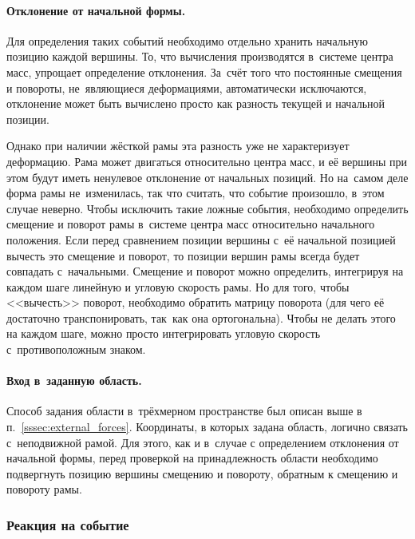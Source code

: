\documentclass[a4paper, 14pt, titlepage]{extarticle}
\begin{document}
        \paragraph{Отклонение от начальной формы.}
        Для определения таких событий необходимо отдельно хранить начальную позицию каждой вершины.
        То, что вычисления производятся в~системе центра масс, упрощает определение
        отклонения. За~счёт того что постоянные смещения и повороты, не~являющиеся деформациями,
        автоматически исключаются, отклонение может быть вычислено просто как разность текущей и
        начальной позиции.

        Однако при наличии жёсткой рамы эта разность уже не характеризует деформацию. Рама может
        двигаться относительно центра масс, и её вершины при этом будут иметь ненулевое отклонение
        от начальных позиций. Но на~самом деле форма рамы не~изменилась, так что считать, что событие
        произошло, в~этом случае неверно. Чтобы исключить такие ложные события, необходимо определить смещение и поворот
        рамы в~системе центра масс относительно начального положения. Если перед сравнением позиции
        вершины с~её начальной позицией вычесть это смещение и поворот, то позиции вершин рамы
        всегда будет совпадать с~начальными. Смещение и поворот можно определить, интегрируя на
        каждом шаге линейную и угловую скорость рамы. Но для того, чтобы <<вычесть>> поворот,
        необходимо обратить матрицу поворота (для чего её достаточно транспонировать, так~как она
        ортогональна). Чтобы не делать этого на каждом шаге, можно просто интегрировать угловую
        скорость с~противоположным знаком.

        \paragraph{Вход в~заданную область.}
        Способ задания области в~трёхмерном пространстве был описан выше в п.~\ref{sssec:external_forces}.
        Координаты, в которых задана область, логично связать с~неподвижной рамой. Для этого, как и
        в~случае с определением отклонения от начальной формы, перед проверкой на принадлежность
        области необходимо подвергнуть позицию вершины смещению и повороту, обратным к смещению и
        повороту рамы.

      \subsubsection{Реакция на событие}
\end{document}
